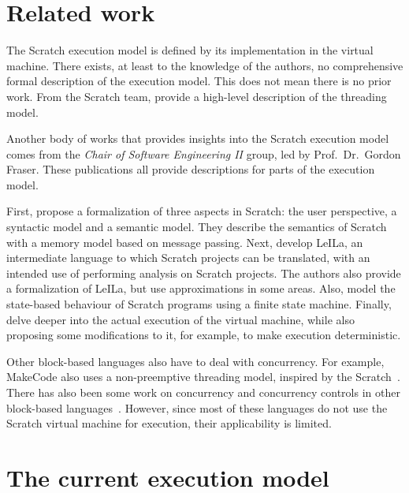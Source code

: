 \documentclass[../main]{subfiles}
\begin{document}
\section{Related work}\label{sec:execution-related-work}

The Scratch execution model is defined by its implementation in the virtual machine.
There exists, at least to the knowledge of the authors, no comprehensive formal description of the execution model.
This does not mean there is no prior work.
From the Scratch team, \textcite{maloneyScratchProgrammingLanguage2010} provide a high-level description of the threading model.

Another body of works that provides insights into the Scratch execution model comes from the \emph{Chair of Software Engineering II} group, led by Prof.\ Dr.\ Gordon Fraser.
These publications all provide descriptions for parts of the execution model.

First, \textcite{stahlbauerTestingScratchPrograms2019} propose a formalization of three aspects in Scratch: the user perspective, a syntactic model and a semantic model.
They describe the semantics of Scratch with a memory model based on message passing.
Next, \textcite{stahlbauerVerifiedScratchProgram2020} develop LeILa, an intermediate language to which Scratch projects can be translated, with an intended use of performing analysis on Scratch projects.
The authors also provide a formalization of LeILa, but use approximations in some areas.
Also, \textcite{gotzModelbasedTestingScratch2022} model the state-based behaviour of Scratch programs using a finite state machine.
Finally, \textcite{deinerAutomatedTestGeneration2023} delve deeper into the actual execution of the virtual machine, while also proposing some modifications to it, for example, to make execution deterministic.

Other block-based languages also have to deal with concurrency.
For example, MakeCode also uses a non-preemptive threading model, inspired by the Scratch~\autocite{ballMicrosoftMakeCodeEmbedded2019}.
There has also been some work on concurrency and concurrency controls in other block-based languages~\autocite{chungConCodeItComparisonConcurrency2020}.
However, since most of these languages do not use the Scratch virtual machine for execution, their applicability is limited.

\section{The current execution model}\label{sec:the-current-execution-model}
\end{document}

